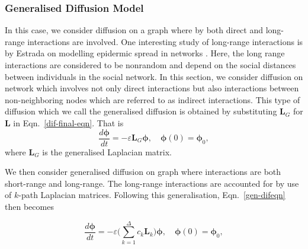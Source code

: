 \documentclass[10pt,a4paper]{article}
\theoremstyle{plain}
\theoremstyle{definition}
\begin{document}
        
        \subsubsection{Generalised Diffusion Model}
        In this case, we consider diffusion on a graph where by both direct and long-range interactions are involved. One interesting study of long-range interactions is by Estrada on modelling epidermic spread in networks \citep{estrada2011epidemic}. Here, the long range interactions are considered to be nonrandom and depend on the social distances between individuals in the social network.
        In this section, we consider diffusion on network which involves not only direct interactions but also interactions between non-neighboring nodes which are referred to as indirect interactions.
        This type of diffusion which we call the generalised diffusion is obtained by substituting $\mathbf{L}_G$ for $\mathbf{L}$ in Eqn.~\ref{dif-final-eqn}. That is 
        \begin{equation}
        \frac{d\boldsymbol{\phi}}{dt} = -\varepsilon \mathbf{L}_{G}\boldsymbol{\phi}, \quad \boldsymbol{\phi}(0) = \boldsymbol{\phi}_0 ,
        \label{gen-difeqn}
        \end{equation}
        where $\mathbf{L}_G$ is the generalised Laplacian matrix. 
        
        
        We then consider generalised diffusion on graph where interactions are both short-range and long-range. The long-range interactions are accounted for by use of $k$-path Laplacian matrices. Following this generalisation, Eqn.~\ref{gen-difeqn} then becomes
        
        \begin{equation}
        \frac{d\boldsymbol{\phi}}{dt} =  -\varepsilon \Big(\sum_{k=1}^{\Delta}c_k\mathbf{L}_{k} \Big) \boldsymbol{\phi}, \quad \boldsymbol{\phi}(0) = \boldsymbol{\phi}_0 ,
        \label{kgen-difeqn}
        \end{equation}
        
\end{document}
